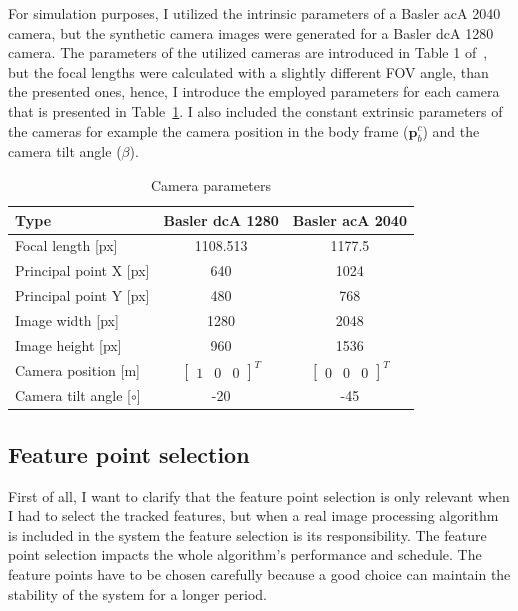 For simulation purposes, I utilized the intrinsic parameters of a Basler acA 2040 camera, but the synthetic camera images were generated for a Basler dcA 1280 camera. The parameters of the utilized cameras are introduced in Table 1 of~\cite{basler}, but the focal lengths were calculated with a slightly different FOV angle, than the presented ones, hence, I introduce the employed parameters for each camera that is presented in Table~\ref{tab:cam-parameters}. I also included the constant extrinsic parameters of the cameras for example the camera position in the body frame ($\mathbf{p}_b^c$) and the camera tilt angle ($\beta$).

\begin{table}[!ht]
    \centering
    \begin{tabular}{| l | c | c |}
        \hline
        Type & Basler dcA 1280 & Basler acA 2040\\ 
        \hline
        Focal length [px] & 1108.513 & 1177.5 \\
        Principal point X [px] & 640 & 1024 \\
        Principal point Y [px] & 480 & 768 \\
        Image width [px] & 1280 & 2048 \\
        Image height [px] & 960 & 1536 \\
        Camera position [m] & $\begin{bmatrix} 1 & 0 & 0 \end{bmatrix}^T$ &  $\begin{bmatrix} 0 & 0 & 0 \end{bmatrix}^T$ \\
        Camera tilt angle [$\si{\circ}$] & -20 & -45 \\
        \hline
    \end{tabular}
    \caption{Camera parameters}\label{tab:cam-parameters}
\end{table}

\subsection{Feature point selection}

First of all, I want to clarify that the feature point selection is only relevant when I had to select the tracked features, but when a real image processing algorithm is included in the system the feature selection is its responsibility. The feature point selection impacts the whole algorithm's performance and schedule. The feature points have to be chosen carefully because a good choice can maintain the stability of the system for a longer period.

